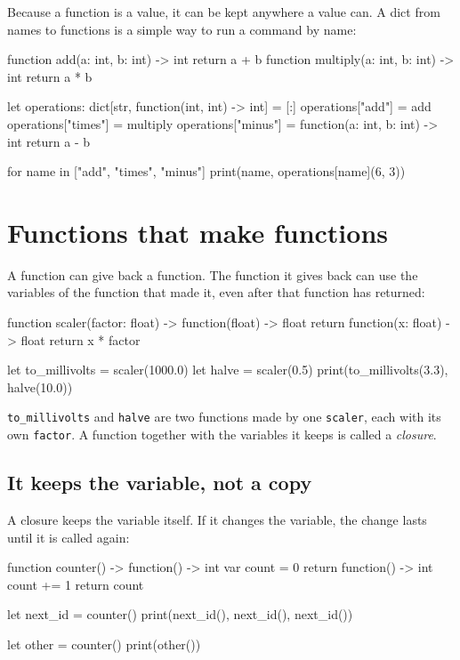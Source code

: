 Because a function is a value, it can be kept anywhere a value can. A
dict from names to functions is a simple way to run a command by name:

\begin{zeno}
function add(a: int, b: int) -> int {
    return a + b
}
function multiply(a: int, b: int) -> int {
    return a * b
}

let operations: dict[str, function(int, int) -> int] = [:]
operations["add"] = add
operations["times"] = multiply
operations["minus"] = function(a: int, b: int) -> int { return a - b }

for name in ["add", "times", "minus"] {
    print(name, operations[name](6, 3))
}
\end{zeno}

\section{Functions that make functions}

A function can give back a function. The function it gives back can
use the variables of the function that made it, even after that
function has returned:

\begin{zeno}
function scaler(factor: float) -> function(float) -> float {
    return function(x: float) -> float { return x * factor }
}

let to_millivolts = scaler(1000.0)
let halve = scaler(0.5)
print(to_millivolts(3.3), halve(10.0))
\end{zeno}

\verb|to_millivolts| and \verb|halve| are two functions made by one
\verb|scaler|, each with its own \verb|factor|. A function together
with the variables it keeps is called a \emph{closure}.

\subsection{It keeps the variable, not a copy}

A closure keeps the variable itself. If it changes the variable, the
change lasts until it is called again:

\begin{zeno}
function counter() -> function() -> int {
    var count = 0
    return function() -> int {
        count += 1
        return count
    }
}

let next_id = counter()
print(next_id(), next_id(), next_id())

let other = counter()
print(other())
\end{zeno}

